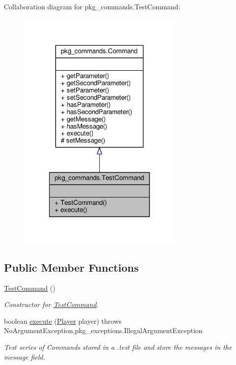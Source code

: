 Collaboration diagram for pkg\-\_\-commands.\-Test\-Command\-:\nopagebreak
\begin{figure}[H]
\begin{center}
\leavevmode
\includegraphics[width=232pt]{classpkg__commands_1_1TestCommand__coll__graph}
\end{center}
\end{figure}
\subsection*{Public Member Functions}
\begin{DoxyCompactItemize}
\item 
\hyperlink{classpkg__commands_1_1TestCommand_a116f412bc5f67f0c344e436d33126f25}{Test\-Command} ()
\begin{DoxyCompactList}\small\item\em Constructor for \hyperlink{classpkg__commands_1_1TestCommand}{Test\-Command}. \end{DoxyCompactList}\item 
boolean \hyperlink{classpkg__commands_1_1TestCommand_a1ff07c27a46910d20c2e4569888892ca}{execute} (\hyperlink{classpkg__world_1_1Player}{Player} player)  throws No\-Argument\-Exception,pkg\-\_\-exceptions.\-Illegal\-Argument\-Exception 
\begin{DoxyCompactList}\small\item\em Test series of Commands stored in a .test file and store the messages in the message field. \end{DoxyCompactList}\end{DoxyCompactItemize}
